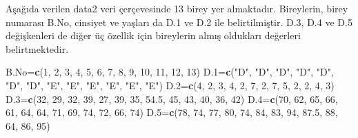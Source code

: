 \documentclass[
]{book}
\newenvironment{Shaded}{\begin{snugshade}}{\end{snugshade}}
\newcommand{\DecValTok}[1]{\textcolor[rgb]{0.00,0.00,0.81}{#1}}
\newcommand{\FloatTok}[1]{\textcolor[rgb]{0.00,0.00,0.81}{#1}}
\newcommand{\FunctionTok}[1]{\textcolor[rgb]{0.13,0.29,0.53}{\textbf{#1}}}
\newcommand{\NormalTok}[1]{#1}
\newcommand{\OtherTok}[1]{\textcolor[rgb]{0.56,0.35,0.01}{#1}}
\newcommand{\StringTok}[1]{\textcolor[rgb]{0.31,0.60,0.02}{#1}}
\begin{document}
Aşağıda verilen data2 veri çerçevesinde 13 birey yer almaktadır. Bireylerin, birey numarası B.No, cinsiyet ve yaşları da D.1 ve D.2 ile belirtilmiştir. D.3, D.4 ve D.5 değişkenleri de diğer üç özellik için bireylerin almış oldukları değerleri belirtmektedir.

\begin{Shaded}
\begin{Highlighting}[]
\NormalTok{B.No}\OtherTok{=}\FunctionTok{c}\NormalTok{(}\DecValTok{1}\NormalTok{,   }\DecValTok{2}\NormalTok{,  }\DecValTok{3}\NormalTok{,  }\DecValTok{4}\NormalTok{,  }\DecValTok{5}\NormalTok{,  }\DecValTok{6}\NormalTok{,  }\DecValTok{7}\NormalTok{,  }\DecValTok{8}\NormalTok{,  }\DecValTok{9}\NormalTok{,  }\DecValTok{10}\NormalTok{, }\DecValTok{11}\NormalTok{, }\DecValTok{12}\NormalTok{, }\DecValTok{13}\NormalTok{)}
\NormalTok{D}\FloatTok{.1}\OtherTok{=}\FunctionTok{c}\NormalTok{(}\StringTok{"D"}\NormalTok{,  }\StringTok{"D"}\NormalTok{,    }\StringTok{"D"}\NormalTok{,    }\StringTok{"D"}\NormalTok{,    }\StringTok{"D"}\NormalTok{,    }\StringTok{"D"}\NormalTok{,    }\StringTok{"D"}\NormalTok{,    }\StringTok{"E"}\NormalTok{,    }\StringTok{"E"}\NormalTok{,    }\StringTok{"E"}\NormalTok{,    }\StringTok{"E"}\NormalTok{,    }\StringTok{"E"}\NormalTok{,    }\StringTok{"E"}\NormalTok{)}
\NormalTok{D}\FloatTok{.2}\OtherTok{=}\FunctionTok{c}\NormalTok{(}\DecValTok{4}\NormalTok{,    }\DecValTok{2}\NormalTok{,  }\DecValTok{3}\NormalTok{,  }\DecValTok{4}\NormalTok{,  }\DecValTok{2}\NormalTok{,  }\DecValTok{7}\NormalTok{,  }\DecValTok{2}\NormalTok{,  }\DecValTok{7}\NormalTok{,  }\DecValTok{5}\NormalTok{,  }\DecValTok{2}\NormalTok{,  }\DecValTok{2}\NormalTok{,  }\DecValTok{4}\NormalTok{,  }\DecValTok{3}\NormalTok{)}
\NormalTok{D}\FloatTok{.3}\OtherTok{=}\FunctionTok{c}\NormalTok{(}\DecValTok{32}\NormalTok{,   }\DecValTok{29}\NormalTok{, }\DecValTok{32}\NormalTok{, }\DecValTok{39}\NormalTok{, }\DecValTok{27}\NormalTok{, }\DecValTok{39}\NormalTok{, }\DecValTok{35}\NormalTok{, }\FloatTok{54.5}\NormalTok{,   }\DecValTok{45}\NormalTok{, }\DecValTok{43}\NormalTok{, }\DecValTok{40}\NormalTok{, }\DecValTok{36}\NormalTok{, }\DecValTok{42}\NormalTok{)}
\NormalTok{D}\FloatTok{.4}\OtherTok{=}\FunctionTok{c}\NormalTok{(}\DecValTok{70}\NormalTok{,   }\DecValTok{62}\NormalTok{, }\DecValTok{65}\NormalTok{, }\DecValTok{66}\NormalTok{, }\DecValTok{61}\NormalTok{, }\DecValTok{64}\NormalTok{, }\DecValTok{64}\NormalTok{, }\DecValTok{71}\NormalTok{, }\DecValTok{69}\NormalTok{, }\DecValTok{74}\NormalTok{, }\DecValTok{72}\NormalTok{, }\DecValTok{66}\NormalTok{, }\DecValTok{74}\NormalTok{)}
\NormalTok{D}\FloatTok{.5}\OtherTok{=}\FunctionTok{c}\NormalTok{(}\DecValTok{78}\NormalTok{,   }\DecValTok{74}\NormalTok{, }\DecValTok{77}\NormalTok{, }\DecValTok{80}\NormalTok{, }\DecValTok{74}\NormalTok{, }\DecValTok{84}\NormalTok{, }\DecValTok{83}\NormalTok{, }\DecValTok{94}\NormalTok{, }\FloatTok{87.5}\NormalTok{,   }\DecValTok{88}\NormalTok{, }\DecValTok{64}\NormalTok{, }\DecValTok{86}\NormalTok{, }\DecValTok{95}\NormalTok{)}


\end{Highlighting}
\end{Shaded}
\end{document}
